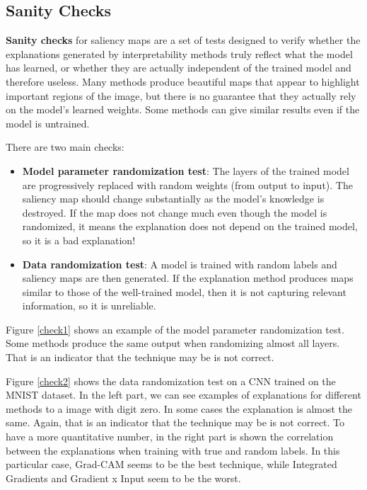 \subsection{Sanity Checks}

\textbf{Sanity checks} for saliency maps are a set of tests designed to verify whether the explanations generated by interpretability methods truly reflect what the model has learned, or whether they are actually independent of the trained model and therefore useless. Many methods produce beautiful maps that appear to highlight important regions of the image, but there is no guarantee that they actually rely on the model's learned weights. Some methods can give similar results even if the model is untrained.

There are two main checks:
\begin{itemize}
\item \textbf{Model parameter randomization test}: The layers of the trained model are progressively replaced with random weights (from output to input). The saliency map should change substantially as the model's knowledge is destroyed. If the map does not change much even though the model is randomized, it means the explanation does not depend on the trained model, so it is a bad explanation!
\item \textbf{Data randomization test}: A model is trained with random labels and saliency maps are then generated. If the explanation method produces maps similar to those of the well-trained model, then it is not capturing relevant information, so it is unreliable.
\end{itemize}

Figure \ref{check1} shows an example of the model parameter randomization test. Some methods produce the same output when randomizing almost all layers. That is an indicator that the technique may be is not correct.

Figure \ref{check2} shows the data randomization test on a CNN trained on the MNIST dataset. In the left part, we can see examples of explanations for different methods to a image with digit zero. In some cases the explanation is almost the same. Again, that is an indicator that the technique may be is not correct. To have a more quantitative number, in the right part is shown the correlation between the explanations when training with true and random labels. In this particular case, Grad-CAM seems to be the best technique, while Integrated Gradients and Gradient x Input seem to be the worst.

